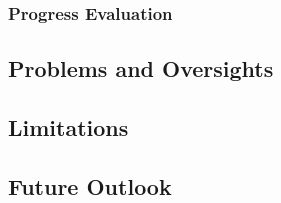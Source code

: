 \documentclass{article}
\begin{document}
\subsubsection{Progress Evaluation}

\subsection{Problems and Oversights}
\lipsum[2][1]

\subsection{Limitations}
\lipsum[2][1]

\subsection{Future Outlook}
\lipsum[2][1]



\newpage


 
\end{document}
